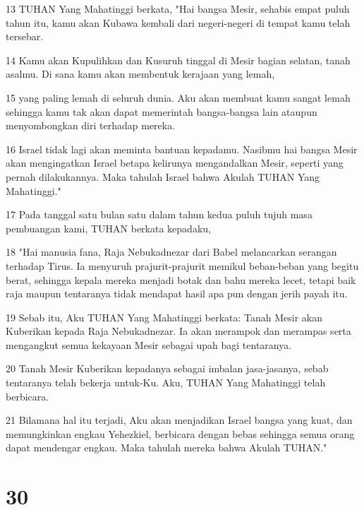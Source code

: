\par 13 TUHAN Yang Mahatinggi berkata, "Hai bangsa Mesir, sehabis empat puluh tahun itu, kamu akan Kubawa kembali dari negeri-negeri di tempat kamu telah tersebar.
\par 14 Kamu akan Kupulihkan dan Kusuruh tinggal di Mesir bagian selatan, tanah asalmu. Di sana kamu akan membentuk kerajaan yang lemah,
\par 15 yang paling lemah di seluruh dunia. Aku akan membuat kamu sangat lemah sehingga kamu tak akan dapat memerintah bangsa-bangsa lain ataupun menyombongkan diri terhadap mereka.
\par 16 Israel tidak lagi akan meminta bantuan kepadamu. Nasibmu hai bangsa Mesir akan mengingatkan Israel betapa kelirunya mengandalkan Mesir, seperti yang pernah dilakukannya. Maka tahulah Israel bahwa Akulah TUHAN Yang Mahatinggi."
\par 17 Pada tanggal satu bulan satu dalam tahun kedua puluh tujuh masa pembuangan kami, TUHAN berkata kepadaku,
\par 18 "Hai manusia fana, Raja Nebukadnezar dari Babel melancarkan serangan terhadap Tirus. Ia menyuruh prajurit-prajurit memikul beban-beban yang begitu berat, sehingga kepala mereka menjadi botak dan bahu mereka lecet, tetapi baik raja maupun tentaranya tidak mendapat hasil apa pun dengan jerih payah itu.
\par 19 Sebab itu, Aku TUHAN Yang Mahatinggi berkata: Tanah Mesir akan Kuberikan kepada Raja Nebukadnezar. Ia akan merampok dan merampas serta mengangkut semua kekayaan Mesir sebagai upah bagi tentaranya.
\par 20 Tanah Mesir Kuberikan kepadanya sebagai imbalan jasa-jasanya, sebab tentaranya telah bekerja untuk-Ku. Aku, TUHAN Yang Mahatinggi telah berbicara.
\par 21 Bilamana hal itu terjadi, Aku akan menjadikan Israel bangsa yang kuat, dan memungkinkan engkau Yehezkiel, berbicara dengan bebas sehingga semua orang dapat mendengar engkau. Maka tahulah mereka bahwa Akulah TUHAN."

\chapter{30}

